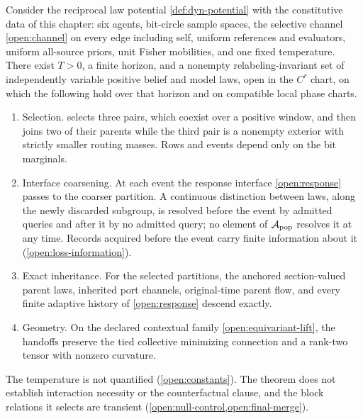 Consider the reciprocal law potential \cref{def:dyn-potential} with the constitutive data of this chapter: six agents, bit-circle sample spaces, the selective channel \cref{open:channel} on every edge including self, uniform references and evaluators, uniform all-source priors, unit Fisher mobilities, and one fixed temperature. There exist $T>0$, a finite horizon, and a nonempty relabeling-invariant set of independently variable positive belief and model laws, open in the $C^r$ chart, on which the following hold over that horizon and on compatible local phase charts.
\begin{enumerate}
\item[(a)] Selection.  selects three pairs, which coexist over a positive window, and then joins two of their parents while the third pair is a nonempty exterior with strictly smaller routing masses. Rows and events depend only on the bit marginals.
\item[(b)] Interface coarsening. At each event the response interface \cref{open:response} passes to the coarser partition. A continuous distinction between laws, along the newly discarded subgroup, is resolved before the event by admitted queries and after it by no admitted query; no element of $\mathcal A_{\rm pop}$ resolves it at any time. Records acquired before the event carry finite information about it (\cref{open:loss-information}).
\item[(c)] Exact inheritance. For the selected partitions, the anchored section-valued parent laws, inherited port channels, original-time parent flow, and every finite adaptive history of \cref{open:response} descend exactly.
\item[(d)] Geometry. On the declared contextual family \cref{open:equivariant-lift}, the handoffs preserve the tied collective minimizing connection and a rank-two tensor with nonzero curvature.
\end{enumerate}
The temperature is not quantified (\cref{open:constants}). The theorem does not establish interaction necessity or the counterfactual clause, and the block relations it selects are transient (\cref{open:null-control,open:final-merge}).
